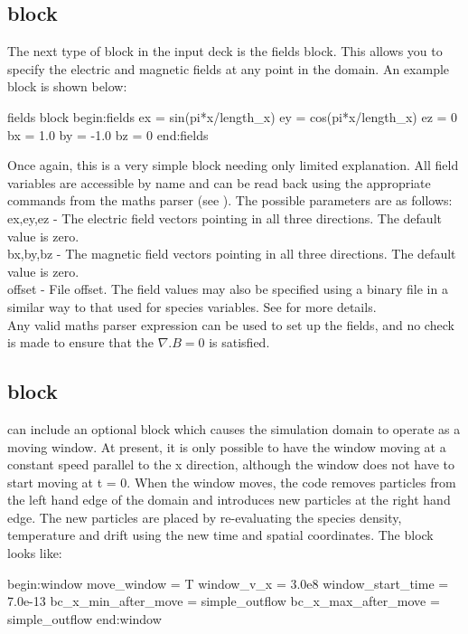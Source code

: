 \subsection{ block}
\label{sec:fields_block}
The next type of block in the {\EPOCH} input deck is the fields block. This
allows you to specify the electric and magnetic fields at any point in the
domain. An example block is shown below:
\begin{lboxverbatim}{fields block}
begin:fields
   ex = sin(pi*x/length_x)
   ey = cos(pi*x/length_x)
   ez = 0
   bx = 1.0
   by = -1.0
   bz = 0
end:fields
\end{lboxverbatim}

Once again, this is a very simple block needing only limited
explanation. All field variables are accessible by name and can be read back
using the appropriate commands from the maths parser (see ).
The possible parameters are as follows:\\

{\emphtext ex,\;ey,\;ez} - The electric field vectors pointing in all three
directions. The default value is zero.\\

{\emphtext bx,\;by,\;bz} - The magnetic field vectors pointing in all three
directions. The default value is zero.\\

{\emphtext offset} - File offset. The field values may also be specified using
a binary file in a similar way to that used for species variables. See
 for more details.\\

Any valid maths parser expression can be used to set up the fields, and no
check is made to ensure that the $\nabla.B = 0$ is satisfied.


\subsection{ block}
\label{sec:window_block}
{\EPOCH} can include an optional block which causes the simulation domain to
operate as a moving window. At present, it is only possible to have the window
moving at a constant speed parallel to the x direction, although the window
does not have to start moving at t = 0. When the window moves, the code removes
particles from the left hand edge of the domain and introduces new particles
at the right hand edge. The new particles are placed by re-evaluating the
species density, temperature and drift using the new time and spatial
coordinates. The block looks like:
\begin{boxverbatim}
begin:window
   move_window = T
   window_v_x = 3.0e8
   window_start_time = 7.0e-13
   bc_x_min_after_move = simple_outflow
   bc_x_max_after_move = simple_outflow
end:window
\end{boxverbatim}

